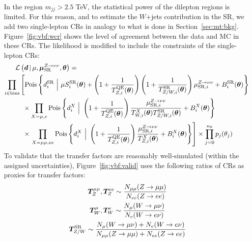 In the region $m_{jj}>2.5$ TeV, the statistical power of the dilepton regions is limited.
For this reason, and to estimate the $W$+jets contribution in the SR, we add two single-lepton CRs in analogy to what is done in Section~\ref{sec:mt:bkg}. 
Figure~\ref{fig:vbf:wcr} shows the level of agreement between the data and MC in these CRs.
The likelihood is modified to include the constraints of the single-lepton CRs:
\begin{align}
    \mathcal{L}\left(\bm{d}\,|\, \mu,\muz,\bm{\theta}\right) = \hspace{-30mm} & \nonumber \\
    \prod_{i\in\mathrm{bins}} & \left[
    \pois\left\{d^{\mathrm{SR}}_{i} ~\Big|~ \mu S^{\mathrm{SR}}_{i}(\bm\theta)  + \left(1+\frac{1}{\Ti{\mathrm{QE}}{Z}(\bm\theta)}\right)\left(1+\frac{1}{\Ti{\mathrm{SR}}{Z/W}(\bm\theta)}\right)\muzi + B^{\mathrm{SR}}_{i}(\bm\theta)\right\} \vphantom{\frac{\muzi}{\Ti{\mu\mu}{Z}(\bm\theta)}}\right. \nonumber \\
    & \phantom{\Big[} \times \prod_{X=\mu,e} \pois\left\{d^{X}_i~\Big|~ \left(1+\frac{1}{\Ti{\mathrm{QE}}{Z}(\bm\theta)}\right)\frac{\muzi}{\Ti{X}{W}(\bm\theta)\Ti{\mathrm{SR}}{Z/W}(\bm\theta)} + B^{X}_i(\bm\theta) \right\} \nonumber \\
    & \phantom{\Big[} \times \left.\prod_{X=\mu\mu,ee} \pois\left\{d^{X}_i~\Big|~ \left(1+\frac{1}{\Ti{\mathrm{QE}}{Z}(\bm\theta)}\right)\frac{\muzi}{\Ti{X}{Z}(\bm\theta)} + B^{X}_i(\bm\theta) \right\} \right]  \times  \prod_{j=0}^{n_\theta} p_j(\theta_j)
\end{align}
To validate that the transfer factors are reasonably well-simulated (within the assigned uncertainties), Figure~\ref{fig:vbf:valid} uses the following ratios of CRs as proxies for transfer factors:
\begin{gather}
    \bm{T}^{\mu\mu}_{Z}, \bm{T}^{ee}_{Z} \sim \frac{N_{\mu\mu}(Z\rightarrow\mu\mu)}{N_{ee}(Z\rightarrow ee)} \nonumber \\ 
    \bm{T}^{\mu}_{W}, \bm{T}^{e}_{W} \sim \frac{N_\mu(W\rightarrow\mu\nu)}{N_e(W\rightarrow e\nu)} \nonumber \\ 
    \bm{T}^{\mathrm{SR}}_{Z/W} \sim \frac{N_\mu(W\rightarrow\mu\nu)+N_e(W\rightarrow e\nu)}{N_{\mu\mu}(Z\rightarrow\mu\mu)+N_{ee}(Z\rightarrow ee)} 
\end{gather}

